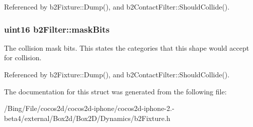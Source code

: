 Referenced by b2\-Fixture\-::\-Dump(), and b2\-Contact\-Filter\-::\-Should\-Collide().

\hypertarget{structb2_filter_a533cccf85e3ba3d9e3700d73b819f6e2}{
\subsubsection[{mask\-Bits}]{\setlength{\rightskip}{0pt plus 5cm}uint16 {\bf b2\-Filter\-::mask\-Bits}}}\label{structb2_filter_a533cccf85e3ba3d9e3700d73b819f6e2}
The collision mask bits. This states the categories that this shape would accept for collision. 

Referenced by b2\-Fixture\-::\-Dump(), and b2\-Contact\-Filter\-::\-Should\-Collide().



The documentation for this struct was generated from the following file\-:\begin{DoxyCompactItemize}
\item 
/\-Bing/\-File/cocos2d/cocos2d-\/iphone/cocos2d-\/iphone-\/2.-\/beta4/external/\-Box2d/\-Box2\-D/\-Dynamics/b2\-Fixture.\-h\end{DoxyCompactItemize}
